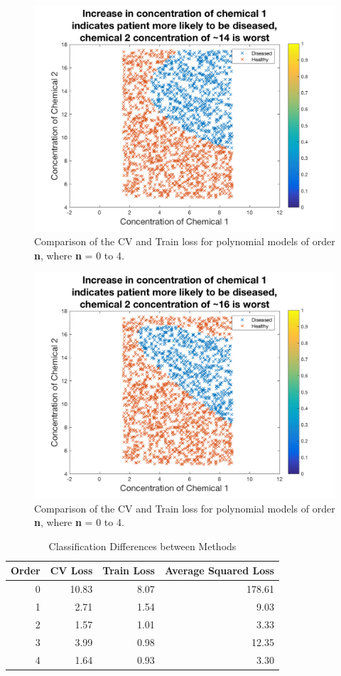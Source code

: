 {\begin{figure}[h]
	\centering
	\includegraphics[width=0.8\linewidth]{images/MLnewData}
	\caption{Comparison of the CV and Train loss for polynomial models of order \textbf{n}, where \textbf{n} = 0 to 4.}
	\label{fig:CVT4}
\end{figure}

\begin{figure}[h]
	\centering
	\includegraphics[width=0.8\linewidth]{images/MLWONnewData}
	\caption{Comparison of the CV and Train loss for polynomial models of order \textbf{n}, where \textbf{n} = 0 to 4.}
	\label{fig:CVT4}
\end{figure}

\begin{table}[h]
	\centering
	\caption{Classification Differences between Methods}
	\label{t:ModLoss}
	\begin{tabular}{rrrr}
		\hline
		\textbf{Order} & \textbf{CV Loss} & \textbf{Train Loss} & \textbf{Average Squared Loss} \\ \hline
		0 & 10.83 & 8.07 & 178.61 \\
		1 & 2.71 & 1.54 & 9.03 \\
		2 & 1.57 & 1.01 & 3.33 \\
		3 & 3.99 & 0.98 & 12.35 \\
		4 & 1.64 & 0.93 & 3.30
	\end{tabular}
\end{table}

}
